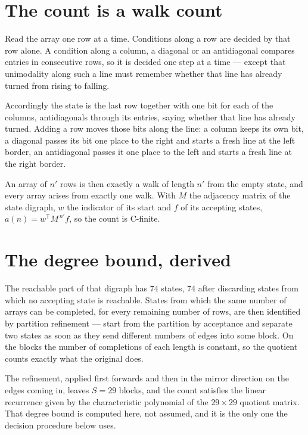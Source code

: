 \documentclass[11pt]{article}
\theoremstyle{definition}
\begin{document}
\section{The count is a walk count}

Read the array one row at a time. Conditions along a row are decided by that row alone. A condition along a column, a diagonal or an antidiagonal compares entries in consecutive rows, so it is decided one step at a time --- except that unimodality along such a line must remember whether that line has already turned from rising to falling.

Accordingly the state is the last row together with one bit for each of the columns, antidiagonals through its entries, saying whether that line has already turned. Adding a row moves those bits along the line: a column keeps its own bit, a diagonal passes its bit one place to the right and starts a fresh line at the left border, an antidiagonal passes it one place to the left and starts a fresh line at the right border.

An array of $n'$ rows is then exactly a walk of length $n'$ from the empty state, and every array arises from exactly one walk. With $M$ the adjacency matrix of the state digraph, $w$ the indicator of its start and $f$ of its accepting states, $a(n) = w^{\mathsf T}M^{\,n'}f$, so the count is C-finite.

\section{The degree bound, derived}

The reachable part of that digraph has $74$ states, $74$ after discarding states from which no accepting state is reachable. States from which the same number of arrays can be completed, for every remaining number of rows, are then identified by partition refinement --- start from the partition by acceptance and separate two states as soon as they send different numbers of edges into some block. On the blocks the number of completions of each length is constant, so the quotient counts exactly what the original does.

The refinement, applied first forwards and then in the mirror direction on the edges coming in, leaves $S = 29$ blocks, and the count satisfies the linear recurrence given by the characteristic polynomial of the $29 \times 29$ quotient matrix. That degree bound is computed here, not assumed, and it is the only one the decision procedure below uses.
\end{document}
